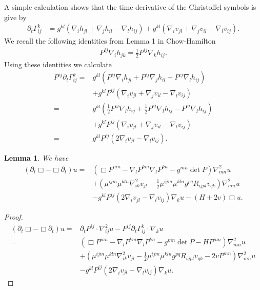 \documentclass{amsart}
\newtheorem{lemma}[theorem]{Lemma}
\theoremstyle{definition}
\theoremstyle{remark}
\numberwithin{equation}{section}
\begin{document}
A simple calculation shows that the time derivative of the Christoffel symbols is give by
\begin{align}
\partial_t \Gamma_{ij}^k&=g^{kl}\left(\nabla_ih_{jl}+\nabla_jh_{il}-\nabla_{l}h_{ij}\right)+g^{kl}\left(\nabla_iv_{jl}+\nabla_jv_{il}-\nabla_{l}v_{ij}\right).
\end{align}
We recall the following identities from Lemma 1 in Chow-Hamilton
\begin{align}
P^{ij}\nabla_ih_{jk}=\frac{1}{2}P^{ij}\nabla_kh_{ij}.
\end{align}
Using these identities we calculate
\begin{align}
P^{ij}\partial_t \Gamma_{ij}^k=&g^{kl}\left(P^{ij}\nabla_ih_{jl}+P^{ij}\nabla_jh_{il}-P^{ij}\nabla_{l}h_{ij}\right)\\
&+g^{kl}P^{ij}\left(\nabla_iv_{jl}+\nabla_jv_{il}-\nabla_{l}v_{ij}\right)\\
=&g^{kl}\left(\frac{1}{2}P^{ij}\nabla_lh_{ij}+\frac{1}{2}P^{ij}\nabla_lh_{ij}-P^{ij}\nabla_{l}h_{ij}\right)\\
&+g^{kl}P^{ij}\left(\nabla_iv_{jl}+\nabla_jv_{il}-\nabla_{l}v_{ij}\right)\\
=&g^{kl}P^{ij}\left(2\nabla_iv_{jl}-\nabla_{l}v_{ij}\right).
\end{align}
\begin{lemma}
 We have
\begin{align}
(\partial_t \Box-\Box\partial_t) u=&\left(\Box P^{mn}-\nabla_l P^{km}\nabla_lP^{kn}-g^{mn}\det P\right)\nabla^2_{mn}u\\
&+\left(\mu^{ijm}\mu^{kln}\nabla^2_{ik}v_{jl}-\frac{1}{2}\mu^{ijm}\mu^{kln}g^{pq}R_{ijpl}v_{qk}\right)\nabla^2_{mn}u\\
&-g^{kl}P^{ij}\left(2\nabla_iv_{jl}-\nabla_{l}v_{ij}\right)\nabla_ku-(H+2v)\Box u.
\end{align}
\end{lemma}
\begin{proof}
\begin{align*}
(\partial_t \Box-\Box \partial_t)u
=&\partial_tP^{ij}\cdot\nabla^2_{ij}u-P^{ij}\partial_t\Gamma_{ij}^k\cdot\nabla_ku\\
=&\left(\Box P^{mn}-\nabla_l P^{km}\nabla_lP^{kn}-g^{mn}\det P-HP^{mn}\right)\nabla^2_{mn}u\\
&+\left(\mu^{ijm}\mu^{kln}\nabla^2_{ik}v_{jl}-\frac{1}{2}\mu^{ijm}\mu^{kln}g^{pq}R_{ijpl}v_{qk}-2vP^{mn}\right)\nabla^2_{mn}u\\
&-g^{kl}P^{ij}\left(2\nabla_iv_{jl}-\nabla_{l}v_{ij}\right)\nabla_ku.
\end{align*}
\end{proof}
\end{document}
